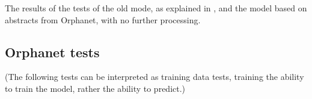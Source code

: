 \documentclass[10pt,letterpaper,final]{article}
\begin{document}
The results of the tests of the old mode, as explained in
\cite{jensenandersen}, and the model based on abstracts from Orphanet,
with no further processing.


\subsection{Orphanet tests}
\label{app:orphanet_old_new}
(The following tests can be interpreted as training data tests, training
the ability to train the model, rather the ability to predict.)
\end{document}
